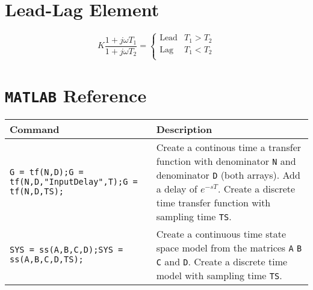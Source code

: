 \begin{landscape}
\begin{multicols*}{2}
\begin{figure}[H]
		\end{figure}

		\section{Lead-Lag Element}

		\[
			K \frac{1 + j\omega T_1}{1 + j\omega T_2} =
			\begin{cases}
				\text{Lead} & T_1 > T_2 \\
				\text{Lag} & T_1 < T_2 \\
			\end{cases}
		\]


		\columnbreak

		\section{\texttt{MATLAB} Reference}

		\begin{table}[H]
			\footnotesize
			\begin{tabularx}{\linewidth}{p{5cm} X}
				\toprule
				\bfseries Command & \bfseries Description \\
				\midrule

				\texttt{G = tf(N,D);\newline G = tf(N,D,"InputDelay",T);\newline G = tf(N,D,TS);} & Create a continous time a transfer function with denominator \texttt{N} and denominator \texttt{D} (both arrays). Add a delay of \(e^{-sT}\). Create a discrete time transfer function with sampling time \texttt{TS}. \\

				\midrule

				\texttt{SYS = ss(A,B,C,D);\newline SYS = ss(A,B,C,D,TS);} & Create a continuous time state space model from the matrices \texttt{A} \texttt{B} \texttt{C} and \texttt{D}. Create a discrete time model with sampling time \texttt{TS}. \\


\end{tabularx}
\end{table}
\end{multicols*}
\end{landscape}
